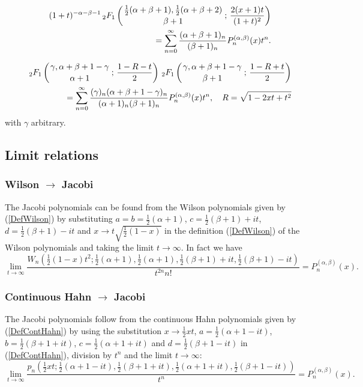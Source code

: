 \documentclass[envcountchap,graybox]{svmono}
\newcounter{rom}
\newcommand{\hyp}[5]{\mbox{}_{#1}{F}_{#2}
\left(\genfrac{}{}{0pt}{}{#3}{#4}\,;\,#5\right)}
\begin{document}
\begin{eqnarray}
\label{GenJacobi4}
& &(1+t)^{-\alpha-\beta-1}\,\hyp{2}{1}{\frac{1}{2}(\alpha+\beta+1),\frac{1}{2}(\alpha+\beta+2)}
{\beta+1}{\frac{2(x+1)t}{(1+t)^2}}\nonumber\\
& &{}=\sum_{n=0}^{\infty}\frac{(\alpha+\beta+1)_n}{(\beta+1)_n}P_n^{(\alpha,\beta)}(x)t^n.
\end{eqnarray}

\begin{eqnarray}
\label{GenJacobi5}
& &\hyp{2}{1}{\gamma,\alpha+\beta+1-\gamma}{\alpha+1}{\frac{1-R-t}{2}}\,
\hyp{2}{1}{\gamma,\alpha+\beta+1-\gamma}{\beta+1}{\frac{1-R+t}{2}}\nonumber\\
& &{}=\sum_{n=0}^{\infty}
\frac{(\gamma)_n(\alpha+\beta+1-\gamma)_n}{(\alpha+1)_n(\beta+1)_n}P_n^{(\alpha,\beta)}(x)t^n,
\quad R=\sqrt{1-2xt+t^2}
\end{eqnarray}
with $\gamma$ arbitrary.

\subsection*{Limit relations}

\subsubsection*{Wilson $\rightarrow$ Jacobi}
The Jacobi polynomials can be found from the Wilson polynomials given by (\ref{DefWilson}) by
substituting $a=b=\frac{1}{2}(\alpha+1)$, $c=\frac{1}{2}(\beta+1)+it$,
$d=\frac{1}{2}(\beta+1)-it$ and $x\rightarrow t\sqrt{\frac{1}{2}(1-x)}$ in the
definition (\ref{DefWilson}) of the Wilson polynomials and taking the limit
$t\rightarrow\infty$. In fact we have
$$\lim_{t\rightarrow\infty}
\frac{W_n(\frac{1}{2}(1-x)t^2;\frac{1}{2}(\alpha+1),
\frac{1}{2}(\alpha+1),\frac{1}{2}(\beta+1)+it,\frac{1}{2}(\beta+1)-it)}
{t^{2n}n!}=P_n^{(\alpha,\beta)}(x).$$

\subsubsection*{Continuous Hahn $\rightarrow$ Jacobi}
The Jacobi polynomials follow from the continuous Hahn polynomials given by (\ref{DefContHahn})
by using the substitution $x\rightarrow \frac{1}{2}xt$, $a=\frac{1}{2}(\alpha+1-it)$,
$b=\frac{1}{2}(\beta+1+it)$, $c=\frac{1}{2}(\alpha+1+it)$ and $d=\frac{1}{2}(\beta+1-it)$
in (\ref{DefContHahn}), division by $t^n$ and the limit $t\rightarrow\infty$:
$$\lim_{t\rightarrow\infty}
\frac{p_n(\frac{1}{2}xt;\frac{1}{2}(\alpha+1-it),\frac{1}{2}(\beta+1+it),
\frac{1}{2}(\alpha+1+it),\frac{1}{2}(\beta+1-it))}{t^n}=P_n^{(\alpha,\beta)}(x).$$
\end{document}
